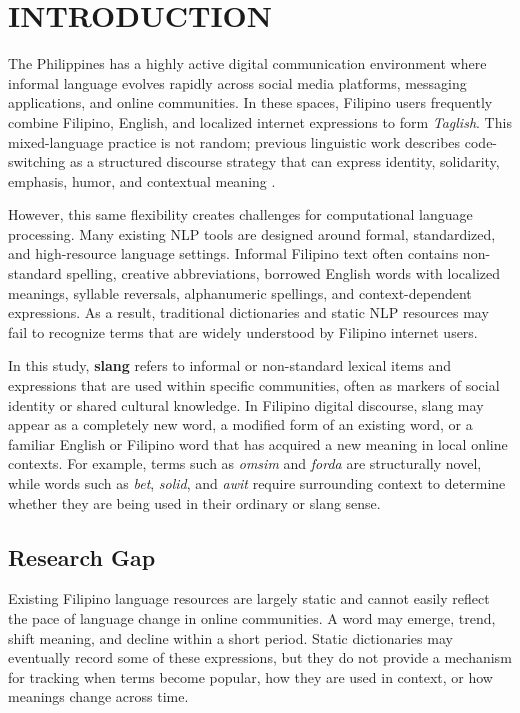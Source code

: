\section{INTRODUCTION}

The Philippines has a highly active digital communication
environment where informal language evolves rapidly across
social media platforms, messaging applications, and online
communities. In these spaces, Filipino users frequently combine
Filipino, English, and localized internet expressions to form
\textit{Taglish}. This mixed-language practice is not random;
previous linguistic work describes code-switching as a
structured discourse strategy that can express identity,
solidarity, emphasis, humor, and contextual meaning
\cite{b1,b2,b3}.

However, this same flexibility creates challenges for
computational language processing. Many existing NLP tools are
designed around formal, standardized, and high-resource
language settings. Informal Filipino text often contains
non-standard spelling, creative abbreviations, borrowed English
words with localized meanings, syllable reversals, alphanumeric
spellings, and context-dependent expressions. As a result,
traditional dictionaries and static NLP resources may fail to
recognize terms that are widely understood by Filipino internet
users.

In this study, \textbf{slang} refers to informal or
non-standard lexical items and expressions that are used within
specific communities, often as markers of social identity or
shared cultural knowledge. In Filipino digital discourse, slang
may appear as a completely new word, a modified form of an
existing word, or a familiar English or Filipino word that has
acquired a new meaning in local online contexts. For example,
terms such as \textit{omsim} and \textit{forda} are
structurally novel, while words such as \textit{bet},
\textit{solid}, and \textit{awit} require surrounding context
to determine whether they are being used in their ordinary or
slang sense.

\subsection{Research Gap}

Existing Filipino language resources are largely static and
cannot easily reflect the pace of language change in online
communities. A word may emerge, trend, shift meaning, and
decline within a short period. Static dictionaries may
eventually record some of these expressions, but they do not
provide a mechanism for tracking when terms become popular, how
they are used in context, or how meanings change across time.

